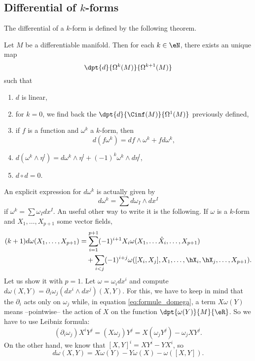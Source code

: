 \subsection{Differential of \texorpdfstring{$k$}{k}-forms}

The differential of a $k$-form is defined by the following theorem.

\begin{theorem}
	Let $M$ be a differentiable manifold. Then for each $k\in \eN$, there exists an unique map
	\[
		\dpt{d}{\Omega^k(M)}{\Omega^{k+1}(M)}
	\]
	such that

	\begin{enumerate}
		\item $d$ is linear,
		\item for $k=0$, we find back the $\dpt{d}{\Cinf(M)}{\Omega^1(M)}$ previously defined,
		\item if $f$ is a function and $\omega^k$ a $k$-form, then
		      \begin{equation}
			      d(f\omega^k)=df\wedge\omega^k+fd\omega^k,
		      \end{equation}


		\item $d(\omega^k\wedge\eta^l)=d\omega^k\wedge\eta^l+(-1)^k\omega^k\wedge d\eta^l$,
		\item $d\circ d=0$.
	\end{enumerate}
\end{theorem}

An explicit expression for $d\omega^k$ is actually given by
\begin{equation}
	d\omega^k=\sum d\omega_I\wedge dx^I
\end{equation}
if $\omega^k=\sum\omega_I dx^I$.
An useful other way to write it is the following. If $\omega$ is a $k$-form and $X_1,\ldots,X_{p+1}$ some vector fields,
\begin{equation}\label{eq:formule_domega}
	\begin{split}
		(k+1)d\omega(X_1,\ldots,X_{p+1})&=\sum_{i=1}^{p+1}(-1)^{i+1}X_i\omega(X_1,\ldots\hat{X}_i,\ldots,X_{p+1})\\
		&\quad+\sum_{i<j}(-1)^{i+j}\omega([X_i,X_j],X_1,\ldots,\hX_i,\hX_j,\ldots,X_{p+1}).
	\end{split}
\end{equation}
Let us show it with $p=1$. Let $\omega=\omega_i dx^i$ and compute $d\omega(X,Y)=\partial_i\omega_j(dx^i\wedge dx^j)(X,Y)$. For this, we have to keep in mind that the $\partial_i$ acts only on $\omega_j$ while, in equation \eqref{eq:formule_domega}, a term $X\omega(Y)$ means --pointwise-- the action of $X$ on the function $\dpt{\omega(Y)}{M}{\eR}$. So we have to use Leibniz formula:
\[
	(\partial_i\omega_j)X^iY^j=(X\omega_j)Y^j
	=X(\omega_j Y^j)-\omega_j XY^j.
\]
On the other hand, we know that $[X,Y]^i=XY^i-YX^i$, so
\begin{equation}
	d\omega(X,Y)=X\omega(Y)-Y\omega(X)-\omega([X,Y]).
\end{equation}

